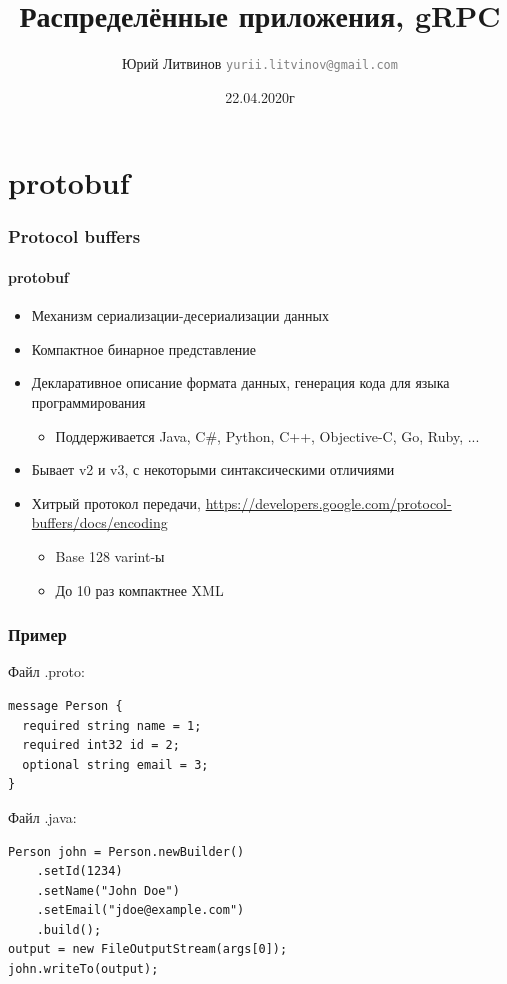 \documentclass[xetex,mathserif,serif]{beamer}
\title{Распределённые приложения, gRPC}
\author[Юрий Литвинов]{Юрий Литвинов \newline \textcolor{gray}{\small\texttt{yurii.litvinov@gmail.com}}}
\date{22.04.2020г}
\begin{document}
    
    \frame{\titlepage}

    \section{protobuf}

    \begin{frame}
        \frametitle{Protocol buffers}
        \framesubtitle{protobuf}
        \begin{itemize}
            \item Механизм сериализации-десериализации данных
            \item Компактное бинарное представление
            \item Декларативное описание формата данных, генерация кода для языка программирования
            \begin{itemize}
                \item Поддерживается Java, C\#, Python, C++, Objective-C, Go, Ruby, ...
            \end{itemize}
            \item Бывает v2 и v3, с некоторыми синтаксическими отличиями
            \item Хитрый протокол передачи, \url{https://developers.google.com/protocol-buffers/docs/encoding}
            \begin{itemize}
                \item Base 128 varint-ы
                \item До 10 раз компактнее XML 
            \end{itemize}
        \end{itemize}
    \end{frame}

    \begin{frame}[fragile]
        \frametitle{Пример}
        Файл .proto:
        \begin{verbatim}
message Person {
  required string name = 1;
  required int32 id = 2;
  optional string email = 3;
}
        \end{verbatim}
        Файл .java:
        \begin{verbatim}
Person john = Person.newBuilder()
    .setId(1234)
    .setName("John Doe")
    .setEmail("jdoe@example.com")
    .build();
output = new FileOutputStream(args[0]);
john.writeTo(output);
        \end{verbatim}
    \end{frame}
\end{document}
